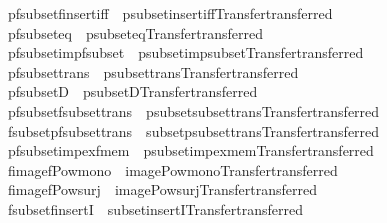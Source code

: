 \begin{isabellebody}
\isamarkupfalse%
\ pfsubset{\isacharunderscore}finsert{\isacharunderscore}iff\ {\isacharequal}\ psubset{\isacharunderscore}insert{\isacharunderscore}iff{\isacharbrackleft}Transfer{\isachardot}transferred{\isacharbrackright}\isanewline
{}\isamarkupfalse%
\ pfsubset{\isacharunderscore}eq\ {\isacharequal}\ psubset{\isacharunderscore}eq{\isacharbrackleft}Transfer{\isachardot}transferred{\isacharbrackright}\isanewline
{}\isamarkupfalse%
\ pfsubset{\isacharunderscore}imp{\isacharunderscore}fsubset\ {\isacharequal}\ psubset{\isacharunderscore}imp{\isacharunderscore}subset{\isacharbrackleft}Transfer{\isachardot}transferred{\isacharbrackright}\isanewline
{}\isamarkupfalse%
\ pfsubset{\isacharunderscore}trans\ {\isacharequal}\ psubset{\isacharunderscore}trans{\isacharbrackleft}Transfer{\isachardot}transferred{\isacharbrackright}\isanewline
{}\isamarkupfalse%
\ pfsubsetD\ {\isacharequal}\ psubsetD{\isacharbrackleft}Transfer{\isachardot}transferred{\isacharbrackright}\isanewline
{}\isamarkupfalse%
\ pfsubset{\isacharunderscore}fsubset{\isacharunderscore}trans\ {\isacharequal}\ psubset{\isacharunderscore}subset{\isacharunderscore}trans{\isacharbrackleft}Transfer{\isachardot}transferred{\isacharbrackright}\isanewline
{}\isamarkupfalse%
\ fsubset{\isacharunderscore}pfsubset{\isacharunderscore}trans\ {\isacharequal}\ subset{\isacharunderscore}psubset{\isacharunderscore}trans{\isacharbrackleft}Transfer{\isachardot}transferred{\isacharbrackright}\isanewline
{}\isamarkupfalse%
\ pfsubset{\isacharunderscore}imp{\isacharunderscore}ex{\isacharunderscore}fmem\ {\isacharequal}\ psubset{\isacharunderscore}imp{\isacharunderscore}ex{\isacharunderscore}mem{\isacharbrackleft}Transfer{\isachardot}transferred{\isacharbrackright}\isanewline
{}\isamarkupfalse%
\ fimage{\isacharunderscore}fPow{\isacharunderscore}mono\ {\isacharequal}\ image{\isacharunderscore}Pow{\isacharunderscore}mono{\isacharbrackleft}Transfer{\isachardot}transferred{\isacharbrackright}\isanewline
{}\isamarkupfalse%
\ fimage{\isacharunderscore}fPow{\isacharunderscore}surj\ {\isacharequal}\ image{\isacharunderscore}Pow{\isacharunderscore}surj{\isacharbrackleft}Transfer{\isachardot}transferred{\isacharbrackright}\isanewline
{}\isamarkupfalse%
\ fsubset{\isacharunderscore}finsertI\ {\isacharequal}\ subset{\isacharunderscore}insertI{\isacharbrackleft}Transfer{\isachardot}transferred{\isacharbrackright}\isanewline
{}\isamarkupfalse%

\end{isabellebody}
